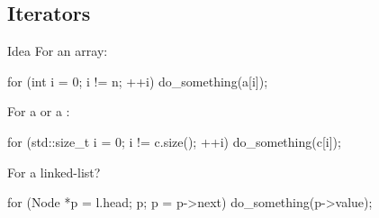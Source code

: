 \subsection{Iterators}

\begin{frame}[fragile]{Idea}
    For an array:
    \begin{cpp}
for (int i = 0; i != n; ++i)
  do_something(a[i]);
    \end{cpp}
    For a  or a :
    \begin{cpp}
for (std::size_t i = 0; i != c.size(); ++i)
  do_something(c[i]);
    \end{cpp}
    For a linked-list?
    \pause
    \begin{cpp}
for (Node *p = l.head; p; p = p->next)
  do_something(p->value);
    \end{cpp}
\end{frame}

